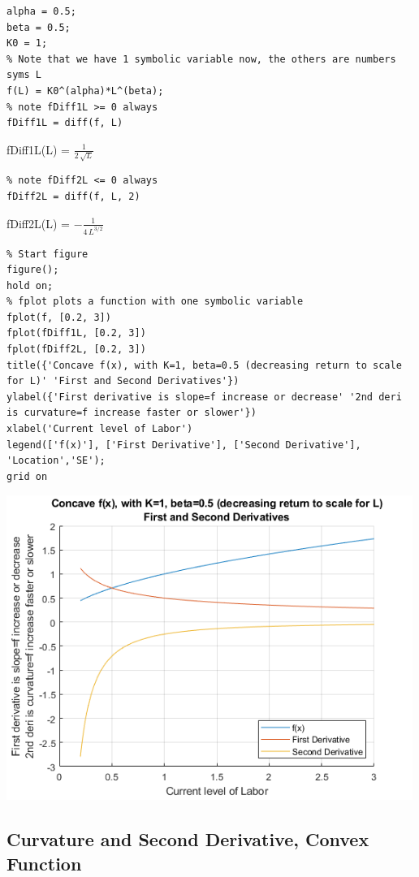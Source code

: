 \documentclass[
]{book}
\begin{document}
\begin{verbatim}
alpha = 0.5;
beta = 0.5;
K0 = 1;
% Note that we have 1 symbolic variable now, the others are numbers
syms L
f(L) = K0^(alpha)*L^(beta);
% note fDiff1L >= 0 always
fDiff1L = diff(f, L)
\end{verbatim}

fDiff1L(L) = \(\displaystyle \frac{1}{2\,\sqrt{L}}\)

\begin{verbatim}
% note fDiff2L <= 0 always
fDiff2L = diff(f, L, 2)
\end{verbatim}

fDiff2L(L) = \(\displaystyle -\frac{1}{4\,L^{3/2} }\)

\begin{verbatim}
% Start figure
figure();
hold on;
% fplot plots a function with one symbolic variable
fplot(f, [0.2, 3])
fplot(fDiff1L, [0.2, 3])
fplot(fDiff2L, [0.2, 3])
title({'Concave f(x), with K=1, beta=0.5 (decreasing return to scale for L)' 'First and Second Derivatives'})
ylabel({'First derivative is slope=f increase or decrease' '2nd deri is curvature=f increase faster or slower'})
xlabel('Current level of Labor')
legend(['f(x)'], ['First Derivative'], ['Second Derivative'], 'Location','SE');
grid on
\end{verbatim}

\includegraphics[width=5.20833in,height=\textheight]{img/second_derivative_images/figure_0.png}

\hypertarget{curvature-and-second-derivative-convex-function}{%
\subsection{Curvature and Second Derivative, Convex Function}\label{curvature-and-second-derivative-convex-function}}
\end{document}
